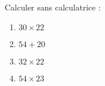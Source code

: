 
\begin{exercice}\label{exo2smath-0106}

    Calculer sans calculatrice :
    \begin{multicols}{2}
        \begin{enumerate}
            \item
                \( 30\times 22\)
            \item
                \( 54+20\)
            \item
                \( 32\times 22\)
            \item
                \( 54\times 23\)
        \end{enumerate}
    \end{multicols}

\end{exercice}
